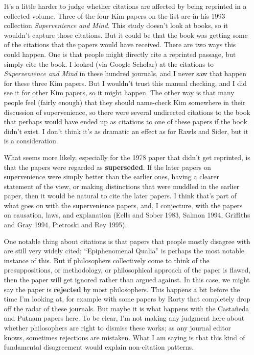 \documentclass[
  10pt,
  letterpaper,
  DIV=11,
  numbers=noendperiod,
  twoside]{scrartcl}
\begin{document}
It's a little harder to judge whether citations are affected by being
reprinted in a collected volume. Three of the four Kim papers on the
list are in his 1993 collection \emph{Supervenience and Mind}. This
study doesn't look at books, so it wouldn't capture those citations. But
it could be that the book was getting some of the citations that the
papers would have received. There are two ways this could happen. One is
that people might directly cite a reprinted passage, but simply cite the
book. I looked (via Google Scholar) at the citations to
\emph{Supervenience and Mind} in these hundred journals, and I never saw
that happen for these three Kim papers. But I wouldn't trust this manual
checking, and I did see it for other Kim papers, so it might happen. The
other way is that many people feel (fairly enough) that they should
name-check Kim somewhere in their discussion of supervenience, so there
were several undirected citations to the book that perhaps would have
ended up as citations to one of these papers if the book didn't exist. I
don't think it's as dramatic an effect as for Rawls and Sider, but it is
a consideration.

What seems more likely, especially for the 1978 paper that didn't get
reprinted, is that the papers were regarded as \textbf{superseded}. If
the later papers on supervenience were simply better than the earlier
ones, having a clearer statement of the view, or making distinctions
that were muddled in the earlier paper, then it would be natural to cite
the later papers. I think that's part of what goes on with the
supervenience papers, and, I conjecture, with the papers on causation,
laws, and explanation (Eells and Sober 1983, Salmon 1994, Griffiths and
Gray 1994, Pietroski and Rey 1995).

One notable thing about citations is that papers that people mostly
disagree with are still very widely cited; ``Epiphenomenal Qualia'' is
perhaps the most notable instance of this. But if philosophers
collectively come to think of the presuppositions, or methodology, or
philosophical approach of the paper is flawed, then the paper will get
ignored rather than argued against. In this case, we might say the paper
is \textbf{rejected} by most philosophers. This happens a bit before the
time I'm looking at, for example with some papers by Rorty that
completely drop off the radar of these journals. But maybe it is what
happens with the Castañeda and Putnam papers here. To be clear, I'm not
making any judgment here about whether philosophers are right to dismiss
these works; as any journal editor knows, sometimes rejections are
mistaken. What I am saying is that this kind of fundamental disagreement
would explain non-citation patterns.
\end{document}
